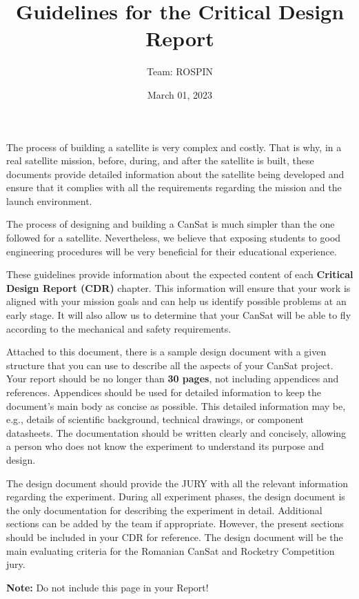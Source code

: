 \documentclass[11pt]{article}
\title{Guidelines for the Critical Design Report
}
\author{Team: ROSPIN}
\date{March 01, 2023}
\begin{document}
\cansattitle



The process of building a satellite is very complex and costly. That is why, in a real satellite mission, before, during, and after the satellite is built, these documents provide detailed information about the satellite being developed and ensure that it complies with all the requirements regarding the mission and the launch environment.

The process of designing and building a CanSat is much simpler than the one followed for a satellite. Nevertheless, we believe that exposing students to good engineering procedures will be very beneficial for their educational experience.

These guidelines provide information about the expected content of each \textbf{Critical Design Report (CDR)} chapter. 
This information will ensure that your work is aligned with your mission goals and can help us identify possible problems at an early stage. 
It will also allow us to determine that your CanSat will be able to fly according to the mechanical and safety requirements.

Attached to this document, there is a sample design document with a given structure that you can use to describe all the aspects of your CanSat project. 
Your report should be no longer than \textbf{30 pages}, not including appendices and references. Appendices should be used for detailed information 
to keep the document's main body as concise as possible. This detailed information may be, e.g., details of scientific background, technical drawings, or 
component datasheets. The documentation should be written clearly and concisely, allowing a person who does not know the experiment to understand its purpose and design.

The design document should provide the JURY with all the relevant information regarding the experiment. 
During all experiment phases, the design document is the only documentation for describing the experiment in detail. 
Additional sections can be added by the team if appropriate. However, the present sections should be included in your CDR for reference. The design document will be the main evaluating criteria for the Romanian CanSat and Rocketry Competition jury.

\vspace{3cm}
{\Large{\textbf{Note:} Do not include this page in your Report!}}
\end{document}
